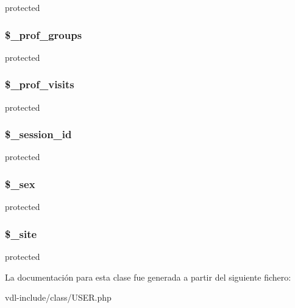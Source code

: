 protected \hypertarget{class_u_s_e_r_a5f31de3c7150ec160bd0cee74d71bb0a}{
\subsubsection[{\$\-\_\-prof\-\_\-groups}]{\setlength{\rightskip}{0pt plus 5cm}\$\-\_\-prof\-\_\-groups\hspace{0.3cm}{\ttfamily [protected]}}}\label{class_u_s_e_r_a5f31de3c7150ec160bd0cee74d71bb0a}
protected \hypertarget{class_u_s_e_r_a8386ebedb107e6834cad8da7d83a8328}{
\subsubsection[{\$\-\_\-prof\-\_\-visits}]{\setlength{\rightskip}{0pt plus 5cm}\$\-\_\-prof\-\_\-visits\hspace{0.3cm}{\ttfamily [protected]}}}\label{class_u_s_e_r_a8386ebedb107e6834cad8da7d83a8328}
protected \hypertarget{class_u_s_e_r_a92023c94926d17b1f6705c8b1d35a103}{
\subsubsection[{\$\-\_\-session\-\_\-id}]{\setlength{\rightskip}{0pt plus 5cm}\$\-\_\-session\-\_\-id\hspace{0.3cm}{\ttfamily [protected]}}}\label{class_u_s_e_r_a92023c94926d17b1f6705c8b1d35a103}
protected \hypertarget{class_u_s_e_r_a0daa294c691b0e2ab4878e2fc06b6706}{
\subsubsection[{\$\-\_\-sex}]{\setlength{\rightskip}{0pt plus 5cm}\$\-\_\-sex\hspace{0.3cm}{\ttfamily [protected]}}}\label{class_u_s_e_r_a0daa294c691b0e2ab4878e2fc06b6706}
protected \hypertarget{class_u_s_e_r_a67945a9e82178c5ceac503d9b26f39b5}{
\subsubsection[{\$\-\_\-site}]{\setlength{\rightskip}{0pt plus 5cm}\$\-\_\-site\hspace{0.3cm}{\ttfamily [protected]}}}\label{class_u_s_e_r_a67945a9e82178c5ceac503d9b26f39b5}
protected 

La documentación para esta clase fue generada a partir del siguiente fichero\-:\begin{DoxyCompactItemize}
\item 
vdl-\/include/class/U\-S\-E\-R.\-php\end{DoxyCompactItemize}
